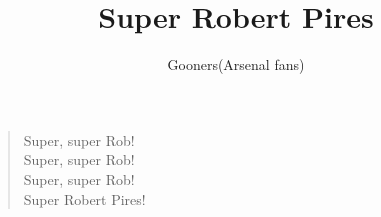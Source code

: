 \documentclass[a4paper,12pt]{article}
\title{Super Robert Pires}
\author{Gooners(Arsenal fans)}
\date{}
\begin{document}
	
	\maketitle
	
	\begin{verse}
		
		Super, super Rob! \\
		Super, super Rob! \\
		Super, super Rob! \\
		Super Robert Pires!
		
	\end{verse}
	
\end{document}
